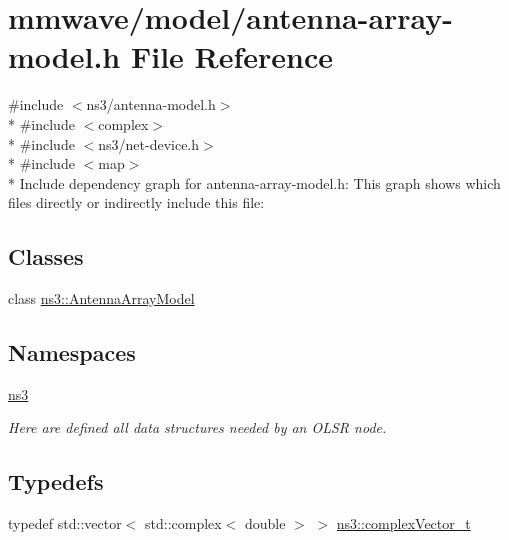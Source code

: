\hypertarget{antenna-array-model_8h}{}\section{mmwave/model/antenna-\/array-\/model.h File Reference}
\label{antenna-array-model_8h}
{\ttfamily \#include $<$ns3/antenna-\/model.\+h$>$}\\*
{\ttfamily \#include $<$complex$>$}\\*
{\ttfamily \#include $<$ns3/net-\/device.\+h$>$}\\*
{\ttfamily \#include $<$map$>$}\\*
Include dependency graph for antenna-\/array-\/model.h\+:
This graph shows which files directly or indirectly include this file\+:
\subsection*{Classes}
\begin{DoxyCompactItemize}
\item 
class \hyperlink{classns3_1_1AntennaArrayModel}{ns3\+::\+Antenna\+Array\+Model}
\end{DoxyCompactItemize}
\subsection*{Namespaces}
\begin{DoxyCompactItemize}
\item 
 \hyperlink{namespacens3}{ns3}
\begin{DoxyCompactList}\small\item\em Here are defined all data structures needed by an O\+L\+SR node. \end{DoxyCompactList}\end{DoxyCompactItemize}
\subsection*{Typedefs}
\begin{DoxyCompactItemize}
\item 
typedef std\+::vector$<$ std\+::complex$<$ double $>$ $>$ \hyperlink{namespacens3_a6a7f75817ae50e6ac47414955b17d926}{ns3\+::complex\+Vector\+\_\+t}
\end{DoxyCompactItemize}
